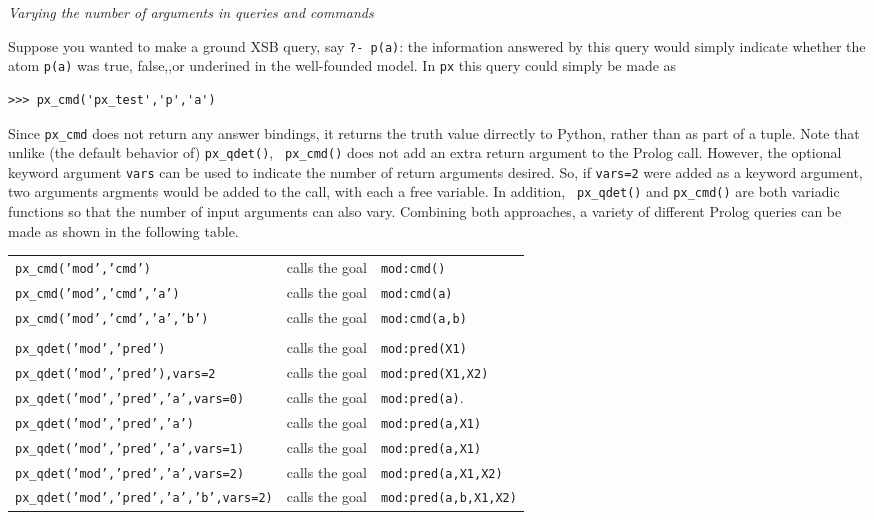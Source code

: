 \begin{example} \rm {\it Varying the number of arguments in queries and commands}

  Suppose you wanted to make a ground XSB query, say {\tt ?- p(a)}:
  the information answered by this query would simply indicate whether
  the atom {\tt p(a)} was true, false,,or underined in the
  well-founded model.  In {\tt px} this query could simply be made as

\begin{verbatim}  
>>> px_cmd('px_test','p','a')  
\end{verbatim}  

Since {\tt px\_cmd} does not return any answer bindings, it returns
the truth value dirrectly to Python, rather than as part of a tuple.
Note that unlike (the default behavior of) {\tt px\_qdet()}, {\tt
  px\_cmd()} does not add an extra return argument to the Prolog call.
However, the optional keyword argument {\tt vars} can be used to
indicate the number of return arguments desired.  So, if {\tt vars=2}
were added as a keyword argument, two arguments argments would be
added to the call, with each a free variable.  In addition, {\tt
  px\_qdet()} and {\tt px\_cmd()} are both variadic functions so that
the number of input arguments can also vary.  Combining both
approaches, a variety of different Prolog queries can be made as shown
in the following table.

\begin{tabular}{lll}
  {\tt px\_cmd('mod','cmd')}                & calls the goal & {\tt mod:cmd()}\\
  {\tt px\_cmd('mod','cmd','a')}            & calls the goal & {\tt mod:cmd(a)}\\
  {\tt px\_cmd('mod','cmd','a','b')}        & calls the goal & {\tt mod:cmd(a,b)}\\
   \\ 
  {\tt px\_qdet('mod','pred')}              & calls the goal & {\tt mod:pred(X1)} \\
  {\tt px\_qdet('mod','pred'),vars=2}       & calls the goal & {\tt mod:pred(X1,X2)} \\
  {\tt px\_qdet('mod','pred','a',vars=0)}   & calls the goal & {\tt mod:pred(a)}. \\
  {\tt px\_qdet('mod','pred','a')}          & calls the goal & {\tt mod:pred(a,X1)} \\
  {\tt px\_qdet('mod','pred','a',vars=1)}   & calls the goal & {\tt mod:pred(a,X1)} \\
  {\tt px\_qdet('mod','pred','a',vars=2)}   & calls the goal & {\tt mod:pred(a,X1,X2)} \\
  {\tt px\_qdet('mod','pred','a','b',vars=2)} & calls the goal & {\tt mod:pred(a,b,X1,X2)} \\
\end{tabular}


\end{example}
